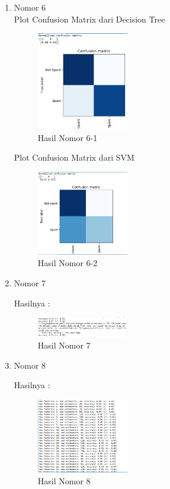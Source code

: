 \begin{enumerate}
\item Nomor 6\\
Plot Confusion Matrix dari Decision Tree
	\begin{figure}[H]
		\includegraphics[width=4cm]{figures/1174054/4/11.png}
		\centering
		\caption{Hasil Nomor 6-1}
	\end{figure}
	
Plot Confusion Matrix dari SVM
\begin{figure}[H]
		\includegraphics[width=4cm]{figures/1174054/4/12.png}
		\centering
		\caption{Hasil Nomor 6-2}
	\end{figure}
	
\item Nomor 7
\hfill\break
	
Hasilnya :
\hfill\break
	\begin{figure}[H]
		\includegraphics[width=4cm]{figures/1174054/4/13.png}
		\centering
		\caption{Hasil Nomor 7}
	\end{figure}
	
\item Nomor 8
\hfill\break
	
Hasilnya :
\hfill\break
	\begin{figure}[H]
		\includegraphics[width=4cm]{figures/1174054/4/14.png}
		\centering
		\caption{Hasil Nomor 8}
	\end{figure}
\end{enumerate}

